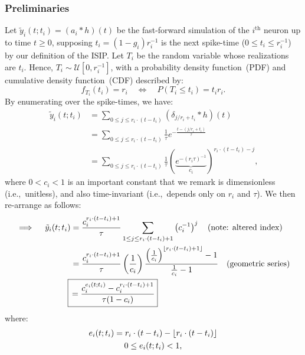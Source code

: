 \subsubsection{Preliminaries}

Let $\tilde{y}_i(t; t_i) = \left(a_i \ast h \right)(t)$ be the fast-forward simulation of the $i^\text{th}$ neuron up to time $t \ge 0$, supposing $t_i = \left(1 - g_i\right)r_i^{-1}$ is the next spike-time ($0 \le t_i \le r_i^{-1}$) by our definition of the ISIP.
Let $T_i$ be the random variable whose realizations are $t_i$.
Hence, $T_i \sim \mathcal{U} [ 0, r_i^{-1} ]$,
with a probability density function~(PDF) and cumulative density function~(CDF) described by:
\begin{equation} \label{eq:spike-distribution}
f_{T_i}(t_i) = r_i \quad \iff \quad P(T_i \le t_i) = t_i r_i \text{.}
\end{equation}
By enumerating over the spike-times, we have:
\begin{align*}
\tilde{y}_i(t; t_i) &= \sum_{0 \le j \le r_i \cdot (t - t_i)} (\delta_{j / r_i + t_i} \ast h)(t) \\
&= \sum_{0 \le j \le r_i \cdot (t - t_i)} \frac{1}{\tau} e^{-\frac{t - (j/r_i + t_i)}{\tau}} \\
&= \sum_{0 \le j \le r_i \cdot (t - t_i)} \frac{1}{\tau} \left( \underbrace{e^{-\left(r_i \tau\right)^{-1}}}_{c_i} \right)^{r_i \cdot (t - t_i) -j}  \text{,}
\end{align*}
where $0 < c_i < 1$ is an important constant that we remark is dimensionless (i.e.,~unitless), and also time-invariant (i.e.,~depends only on $r_i$ and $\tau$).
We then re-arrange as follows:
\begin{align}
\label{eq:neuron}
\implies \quad \tilde{y}_i(t; t_i) &= \frac{c_i^{r_i \cdot (t - t_i) + 1}}{\tau} \sum_{1 \le j \le r_i \cdot (t - t_i) + 1} \left( c_i^{-1} \right)^j \quad \text{(note: altered index)} \nonumber \\
&= \frac{c_i^{r_i \cdot (t - t_i) + 1}}{\tau} \left( \frac{1}{c_i} \right) \frac{\left( \frac{1}{c_i} \right)^{\floor{r_i \cdot (t - t_i) + 1}} - 1}{\frac{1}{c_i} - 1} \quad \text{(geometric series)} \nonumber \\
\Aboxed{ &\,= \frac{c_i^{e_i(t; t_i)} - c_i^{r_i \cdot (t - t_i) + 1}}{\tau(1 - c_i)}} 
\end{align}
where:
\begin{equation}
\begin{gathered}
\label{eq:delta} %
e_i(t; t_i) = r_i \cdot (t - t_i) - \floor{r_i \cdot (t - t_i)} \\
0 \le e_i(t; t_i) < 1 \text{,}
\end{gathered}
\end{equation}
